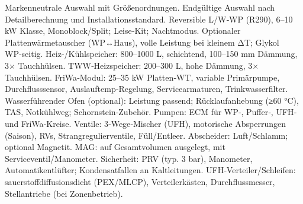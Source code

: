 \markdownRendererDocumentBegin
\markdownRendererSectionBegin
{}\markdownRendererInterblockSeparator
{}Markenneutrale Auswahl mit Größenordnungen. Endgültige Auswahl nach Detailberechnung und Installationsstandard.\markdownRendererInterblockSeparator
{}\markdownRendererSectionBegin
{}\markdownRendererInterblockSeparator
{}\markdownRendererUlBeginTight
\markdownRendererUlItem Reversible L/W‑WP (R290), 6–10 kW Klasse, Monoblock/Split; Leise‑Kit; Nachtmodus.\markdownRendererUlItemEnd 
\markdownRendererUlItem Optionaler Plattenwärmetauscher (WP↔Haus), volle Leistung bei kleinem ΔT; Glykol WP‑seitig.\markdownRendererUlItemEnd 
\markdownRendererUlItem Heiz-/Kühlspeicher: 800–1000 L, schichtend, 100–150 mm Dämmung, 3× Tauchhülsen.\markdownRendererUlItemEnd 
\markdownRendererUlItem TWW‑Heizspeicher: 200–300 L, hohe Dämmung, 3× Tauchhülsen.\markdownRendererUlItemEnd 
\markdownRendererUlItem FriWa‑Modul: 25–35 kW Platten‑WT, variable Primärpumpe, Durchflusssensor, Auslauftemp‑Regelung, Servicearmaturen, Trinkwasserfilter.\markdownRendererUlItemEnd 
\markdownRendererUlItem Wasserführender Ofen (optional): Leistung passend; Rücklaufanhebung (≥60 °C), TAS, Notkühlweg; Schornstein‑Zubehör.\markdownRendererUlItemEnd 
\markdownRendererUlEndTight \markdownRendererInterblockSeparator
{}
\markdownRendererSectionEnd \markdownRendererSectionBegin
{}\markdownRendererInterblockSeparator
{}\markdownRendererUlBeginTight
\markdownRendererUlItem Pumpen: ECM für WP‑, Puffer‑, UFH‑ und FriWa‑Kreise.\markdownRendererUlItemEnd 
\markdownRendererUlItem Ventile: 3‑Wege‑Mischer (UFH), motorische Absperrungen (Saison), RVs, Strangregulierventile, Füll/Entleer.\markdownRendererUlItemEnd 
\markdownRendererUlItem Abscheider: Luft/Schlamm; optional Magnetit.\markdownRendererUlItemEnd 
\markdownRendererUlItem MAG: auf Gesamtvolumen ausgelegt, mit Serviceventil/Manometer.\markdownRendererUlItemEnd 
\markdownRendererUlItem Sicherheit: PRV (typ. 3 bar), Manometer, Automatikentlüfter; Kondensatfallen an Kaltleitungen.\markdownRendererUlItemEnd 
\markdownRendererUlEndTight \markdownRendererInterblockSeparator
{}
\markdownRendererSectionEnd \markdownRendererSectionBegin
{}\markdownRendererInterblockSeparator
{}\markdownRendererUlBeginTight
\markdownRendererUlItem UFH‑Verteiler/Schleifen: sauerstoffdiffusionsdicht (PEX/MLCP), Verteilerkästen, Durchflussmesser, Stellantriebe (bei Zonenbetrieb).\markdownRendererUlItemEnd 
